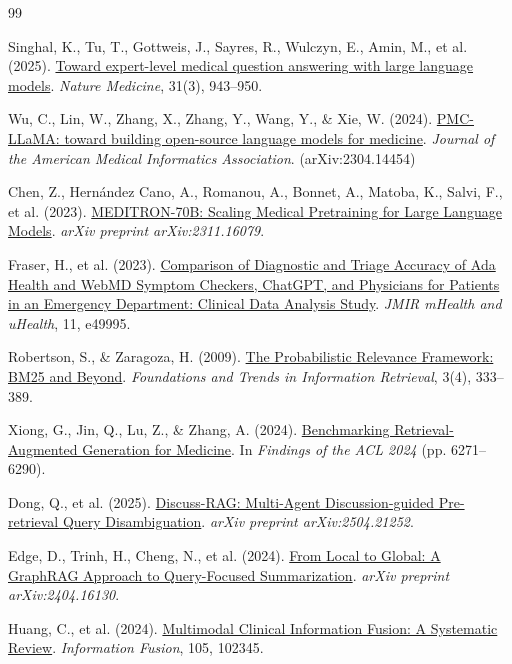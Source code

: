 \begin{thebibliography}{99}

Singhal, K., Tu, T., Gottweis, J., Sayres, R., Wulczyn, E., Amin, M., et al. (2025).
\href{https://doi.org/10.1038/s41591-024-03423-7}{Toward expert-level medical question answering with large language models}.
\textit{Nature Medicine}, 31(3), 943--950.

Wu, C., Lin, W., Zhang, X., Zhang, Y., Wang, Y., \& Xie, W. (2024).
\href{https://doi.org/10.1093/jamia/ocae045}{PMC-LLaMA: toward building open-source language models for medicine}.
\textit{Journal of the American Medical Informatics Association}. (arXiv:2304.14454)

Chen, Z., Hernández Cano, A., Romanou, A., Bonnet, A., Matoba, K., Salvi, F., et al. (2023).
\href{https://arxiv.org/abs/2311.16079}{MEDITRON-70B: Scaling Medical Pretraining for Large Language Models}.
\textit{arXiv preprint arXiv:2311.16079}.

Fraser, H., et al. (2023).
\href{https://doi.org/10.2196/49995}{Comparison of Diagnostic and Triage Accuracy of Ada Health and WebMD Symptom Checkers, ChatGPT, and Physicians for Patients in an Emergency Department: Clinical Data Analysis Study}.
\textit{JMIR mHealth and uHealth}, 11, e49995.

Robertson, S., \& Zaragoza, H. (2009).
\href{https://doi.org/10.1561/1500000019}{The Probabilistic Relevance Framework: BM25 and Beyond}.
\textit{Foundations and Trends in Information Retrieval}, 3(4), 333--389.

Xiong, G., Jin, Q., Lu, Z., \& Zhang, A. (2024).
\href{https://aclanthology.org/2024.findings-acl.372/}{Benchmarking Retrieval-Augmented Generation for Medicine}.
In \textit{Findings of the ACL 2024} (pp. 6271--6290).

Dong, Q., et al. (2025).
\href{https://arxiv.org/abs/2504.21252}{Discuss-RAG: Multi-Agent Discussion-guided Pre-retrieval Query Disambiguation}.
\textit{arXiv preprint arXiv:2504.21252}.

Edge, D., Trinh, H., Cheng, N., et al. (2024).
\href{https://arxiv.org/abs/2404.16130}{From Local to Global: A GraphRAG Approach to Query-Focused Summarization}.
\textit{arXiv preprint arXiv:2404.16130}.

Huang, C., et al. (2024).
\href{https://doi.org/10.1016/j.inffus.2024.102345}{Multimodal Clinical Information Fusion: A Systematic Review}.
\textit{Information Fusion}, 105, 102345.


\end{thebibliography}
